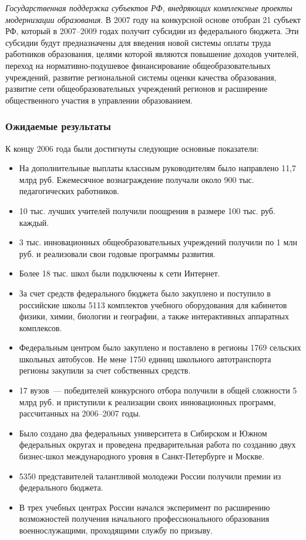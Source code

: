 \documentclass[article, 12pt, russian, oneside]{ncc}
\begin{document}
\emph{Государственная поддержка субъектов РФ, внедряющих комплексные
  проекты модернизации образования}. В 2007 году на конкурсной основе
отобран 21 субъект РФ, который в 2007--2009 годах получит субсидии из
федерального бюджета. Эти субсидии будут предназначены для введения
новой системы оплаты труда работников образования, целями которой
являются повышение доходов учителей, переход на нормативно-подушевое
финансирование общеобразовательных учреждений, развитие региональной
системы оценки качества образования, развитие сети общеобразовательных
учреждений регионов и расширение общественного участия в управлении
образованием.

\subsubsection{Ожидаемые результаты}

К концу 2006 года были достигнуты следующие основные показатели:

\begin{itemize}
\item На дополнительные выплаты классным руководителям было направлено
  11,7 млрд руб. Ежемесячное вознаграждение получали около 900
  тыс. педагогических работников.
\item 10 тыс. лучших учителей получили поощрения в размере 100
  тыс. руб. каждый.
\item 3 тыс. инновационных общеобразовательных учреждений получили по
  1 млн руб. и реализовали свои годовые программы развития.
\item Более 18 тыс. школ были подключены к сети Интернет.
\item За счет средств федерального бюджета было закуплено и поступило
  в российские школы 5113 комплектов учебного оборудования для
  кабинетов физики, химии, биологии и географии, а также интерактивных
  аппаратных комплексов.
\item Федеральным центром было закуплено и поставлено в регионы 1769
  сельских школьных автобусов. Не мене 1750 единиц школьного
  автотранспорта регионы закупили за счет собственных средств.
\item 17 вузов~--- победителей конкурсного отбора получили в общей
  сложности 5 млрд руб. и приступили к реализации своих инновационных
  программ, рассчитанных на 2006--2007 годы.
\item Было создано два федеральных университета в Сибирском и Южном
  федеральных округах и проведена предварительная работа по созданию
  двух бизнес-школ международного уровня в Санкт-Петербурге и Москве.
\item 5350 представителей талантливой молодежи России получили премии
  из федерального бюджета.
\item В трех учебных центрах России начался эксперимент по расширению
  возможностей получения начального профессионального образования
  военнослужащими, проходящими службу по призыву.
\end{itemize}
\end{document}
